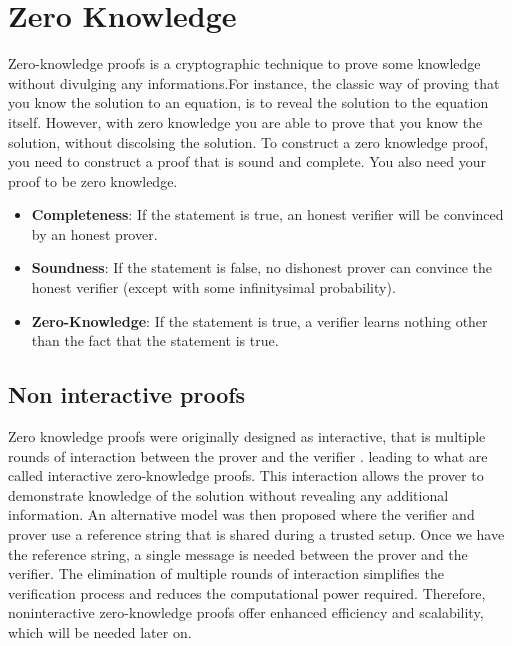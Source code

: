 \section{Zero Knowledge}

Zero-knowledge proofs is a cryptographic technique to prove some knowledge without divulging any informations.For instance,
the classic way of proving that you know the solution to an equation, is to reveal the solution to the equation itself.
However, with zero knowledge you are able to prove that you know the solution, without discolsing the solution. 
To construct a zero knowledge proof, you need to construct a proof that is sound and complete. You also need your proof to be zero knowledge\cite{LZK}.

\begin{itemize}

    \item \textbf{Completeness}: If the statement is true, an honest verifier will be convinced by an honest prover.
    
    \item \textbf{Soundness}: If the statement is false, no dishonest prover can convince the honest verifier (except with some infinitysimal probability).
    
    \item \textbf{Zero-Knowledge}: If the statement is true,  a verifier learns nothing other than the fact that the statement is true. \cite{LC23}
    
    \end{itemize}

    \subsection{Non interactive proofs} 



Zero knowledge proofs were originally designed as interactive, that is multiple rounds of interaction between the prover and the verifier \cite{GMR89}.
 leading to what are called interactive zero-knowledge proofs. This interaction allows the prover to demonstrate knowledge of the solution without revealing any additional information.
 An alternative model was then proposed where the verifier and prover use a reference string that is shared during a trusted setup. Once we have the reference string, a single message is needed between the prover and the verifier.
 The elimination of multiple rounds of interaction simplifies the verification process and reduces the computational power required. 
 Therefore, noninteractive zero-knowledge proofs offer enhanced efficiency and scalability, which will be needed later on.  \cite{BFM88} \cite{GMW91}


